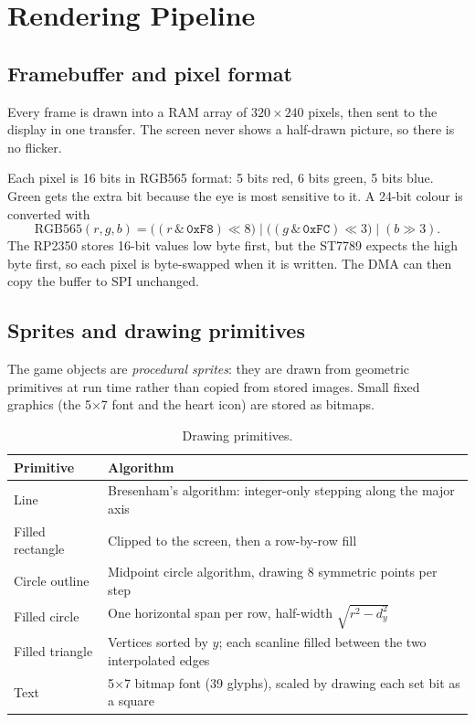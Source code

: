 \documentclass[11pt,a4paper]{article}
\begin{document}
\section{Rendering Pipeline}\label{sec:render}

\subsection{Framebuffer and pixel format}
Every frame is drawn into a RAM array of $320\times240$ pixels, then sent to the
display in one transfer. The screen never shows a half-drawn picture, so there is
no flicker.

Each pixel is 16 bits in RGB565 format: 5 bits red, 6 bits green, 5 bits blue.
Green gets the extra bit because the eye is most sensitive to it. A 24-bit colour
is converted with
\[
  \text{RGB565}(r,g,b) = \big((r \,\&\, \texttt{0xF8}) \ll 8\big) \;|\;
                         \big((g \,\&\, \texttt{0xFC}) \ll 3\big) \;|\; (b \gg 3).
\]
The RP2350 stores 16-bit values low byte first, but the ST7789 expects the high
byte first, so each pixel is byte-swapped when it is written. The DMA can then
copy the buffer to SPI unchanged.

\subsection{Sprites and drawing primitives}
The game objects are \emph{procedural sprites}: they are drawn from geometric
primitives at run time rather than copied from stored images. Small fixed
graphics (the 5$\times$7 font and the heart icon) are stored as bitmaps.

\begin{table}[H]
\centering
\caption{Drawing primitives.}\label{tab:prims}
\begin{tabularx}{\linewidth}{lX}
\toprule
\textbf{Primitive} & \textbf{Algorithm} \\
\midrule
Line & Bresenham's algorithm: integer-only stepping along the major axis \\
Filled rectangle & Clipped to the screen, then a row-by-row fill \\
Circle outline & Midpoint circle algorithm, drawing 8 symmetric points per step \\
Filled circle & One horizontal span per row, half-width $\sqrt{r^2-d_y^2}$ \\
Filled triangle & Vertices sorted by $y$; each scanline filled between the two interpolated edges \\
Text & 5$\times$7 bitmap font (39 glyphs), scaled by drawing each set bit as a square \\
\bottomrule
\end{tabularx}
\end{table}
\end{document}
